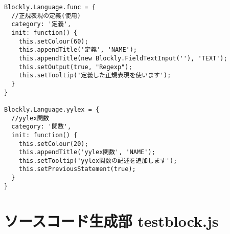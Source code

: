 \documentclass{risepaper}
\begin{document}
\begin{verbatim}
Blockly.Language.func = {
  //正規表現の定義(使用)
  category: '定義',
  init: function() {
    this.setColour(60);
    this.appendTitle('定義', 'NAME');
    this.appendTitle(new Blockly.FieldTextInput(''), 'TEXT');
    this.setOutput(true, "Regexp");
    this.setTooltip('定義した正規表現を使います');
  }
}

Blockly.Language.yylex = {
  //yylex関数
  category: '関数',
  init: function() {
    this.setColour(20);
    this.appendTitle('yylex関数', 'NAME');
    this.setTooltip('yylex関数の記述を追加します');
    this.setPreviousStatement(true);
  }
}
\end{verbatim}

\section{ソースコード生成部 testblock.js}
\end{document}
